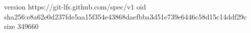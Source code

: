 version https://git-lfs.github.com/spec/v1
oid sha256:e8a62e0d237fde5aa15f354e43868daefbba3d51e739e6446c58d15c14ddf29c
size 349660
